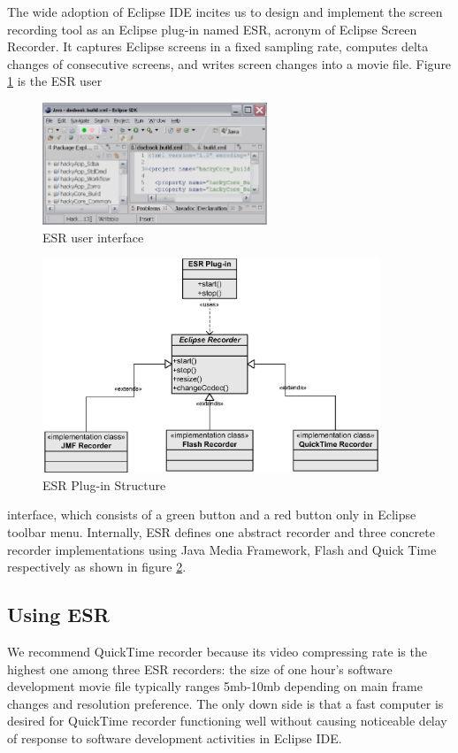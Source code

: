 The wide adoption of Eclipse IDE incites us to design and implement the
screen recording tool as an Eclipse plug-in named ESR\cite{esr}, acronym of
Eclipse Screen Recorder. It captures Eclipse screens in a fixed sampling
rate, computes delta changes of consecutive screens, and writes screen
changes into a movie file. Figure \ref{fig:esr-gui} is the ESR user
\begin{figure}[htbp] 
  \centering \includegraphics[width=0.6\textwidth]{figs/esr-gui.eps}
  \caption{ESR user interface}\label{fig:esr-gui}
\end{figure} 
\begin{figure}[htbp] 
  \centering
  \includegraphics[width=0.9\textwidth]{figs/esr-structure.eps}
  \caption{ESR Plug-in Structure}\label{fig:esr-plugin}
\end{figure} 
interface, which consists of a green button and a red button only in
Eclipse toolbar menu. Internally, ESR defines one abstract recorder and
three concrete recorder implementations using Java Media Framework, Flash
and Quick Time respectively as shown in figure \ref{fig:esr-plugin}.

\subsection{Using ESR}
We recommend QuickTime recorder because its video compressing rate is the
highest one among three ESR recorders: the size of one hour's software
development movie file typically ranges 5mb-10mb depending on main frame
changes and resolution preference. The only down side is that a fast
computer is desired for QuickTime recorder functioning well without causing
noticeable delay of response to software development activities in Eclipse
IDE.

